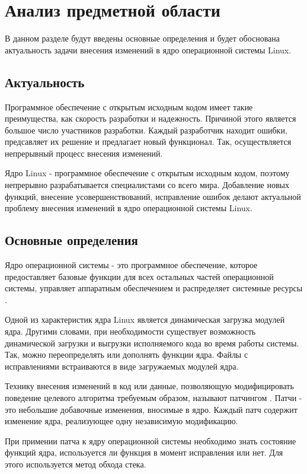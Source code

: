 \chapter{Анализ предметной области}

В данном разделе будут введены основные определения и будет обоснована актуальность задачи внесения изменений в ядро операционной системы Linux.

\section{Актуальность}

Программное обеспечение с открытым исходным кодом имеет такие преимущества, как скорость разработки и надежность. Причиной этого является большое число участников разработки. Каждый разработчик находит ошибки, предсавляет их решение и предлагает новый функционал. Так, осуществляется непрерывный процесс внесения изменений.

Ядро Linux - программное обеспечение с открытым исходным кодом, поэтому непрерывно разрабатывается специалистами со всего мира. Добавление новых функций, внесение усовершенствований, исправление ошибок делают актуальной проблему внесения изменений в ядро операционной системы Linux.

\section{Основные определения}

Ядро операционной системы - это программное обеспечение, которое предоставляет базовые функции для всех остальных частей операционной системы, управляет аппаратным обеспечением и распределяет системные ресурсы \cite{love}.

Одной из характеристик ядра Linux является динамическая загрузка модулей ядра. Другими словами, при необходимости существует возможность динамической загрузки и выгрузки исполняемого кода во время работы системы. Так, можно переопределять или дополнять функции ядра. Файлы с исправлениями встраиваются в виде загружаемых модулей ядра.

Технику внесения изменений в код или данные, позволяющую модифицировать поведение целевого алгоритма требуемым образом, называют патчингом \cite{patching}. Патчи - это небольшие добавочные изменения, вносимые в ядро. Каждый патч содержит изменение ядра, реализующее одну независимую модификацию.

При примении патча к ядру операционной системы необходимо знать состояние функций ядра, используется ли функция в момент исправления или нет. Для этого используется метод обхода стека.

